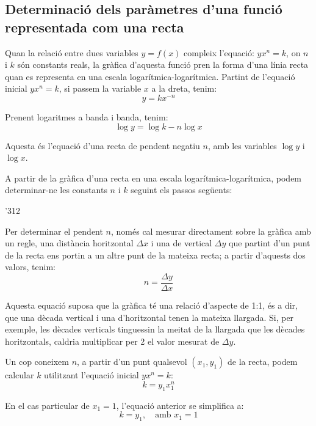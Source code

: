 \subsection{Determinació dels paràmetres d'una funció representada com una recta}\label{sec:escales-log-yxnk}

Quan la relació entre dues variables $y=f(x)$ compleix l'equació: $y x^n = k$, on $n$ i $k$  són constants  reals, la gràfica d'aquesta funció pren la forma d'una línia recta quan es representa en una escala logarítmica-logarítmica. Partint de l'equació inicial $y x^n = k$, si passem la variable $x$ a la dreta, tenim:
\begin{equation}
  y = k x^{-n}
\end{equation}

Prenent logaritmes a banda i banda, tenim:
\begin{equation}
  \log y = \log k - n \log x
\end{equation}

Aquesta és l'equació d'una recta de pendent negatiu $n$, amb les variables $\log y$ i $\log x$.

A partir de la gràfica d'una recta en una escala logarítmica-logarítmica, podem determinar-ne les constants $n$ i $k$ seguint els passos següents:

\begin{dingautolist}{'312}
    \item Per  determinar el pendent $n$, només cal mesurar directament sobre la gràfica amb un regle, una distància horitzontal $\Delta{}x$ i una de vertical $\Delta{}y$ que partint d'un punt de la recta ens portin a un altre punt de la mateixa recta; a partir d'aquests dos valors, tenim:
        \begin{equation}
          n = \frac{\Delta{}y}{\Delta{}x}
        \end{equation}

        Aquesta equació suposa que la gràfica té una relació d'aspecte de 1:1, és a dir, que una dècada vertical i una d'horitzontal tenen la mateixa llargada. Si, per exemple, les dècades verticals tinguessin la meitat de la llargada que les dècades  horitzontals, caldria multiplicar per 2 el valor mesurat de $\Delta{}y$.

   \item  Un cop  coneixem $n$, a partir d'un punt qualsevol $(x_1, y_1)$ de la recta, podem calcular $k$ utilitzant l'equació inicial $y x^n = k$:
        \begin{equation}
          k =  y_1 x_1^n
        \end{equation}

        En el cas particular de $x_1=1$, l'equació anterior se simplifica a:\begin{equation}
           k = y_1, \quad \text{amb }x_1=1
        \end{equation}
\end{dingautolist}

